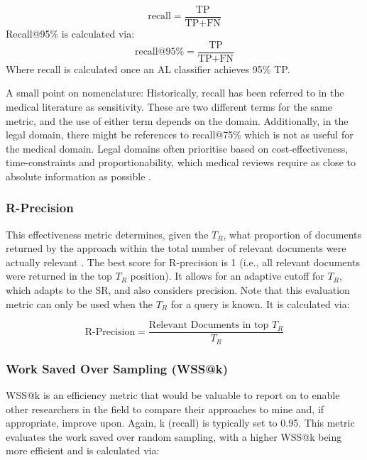 \documentclass[../main.tex]{subfiles}
\begin{document}
\begin{equation}
\text{recall} = \frac{\text{TP}}{\text{TP} + \text{FN}}
\end{equation}
Recall@95\% is calculated via:
\begin{equation}
\text{recall@95\%} = \frac{\text{TP}}{\text{TP} + \text{FN}}
\end{equation}
Where recall is calculated once an AL classifier achieves 95\% TP.

A small point on nomenclature: Historically, recall has been referred to in the medical literature as sensitivity. These are two different terms for the same metric, and the use of either term depends on the domain. Additionally, in the legal domain, there might be references to recall@75\% which is not as useful for the medical domain. Legal domains often prioritise based on cost-effectiveness, time-constraints and proportionability, which medical reviews require as close to absolute information as possible \cite{tsafnat_systematic_2014}.

\subsubsection{R-Precision}
This effectiveness metric determines, given the \textbf{$T_R$}, what proportion of documents returned by the approach within the total number of relevant documents were actually relevant \cite{manning_introduction_2008}. The best score for R-precision is 1 (i.e., all relevant documents were returned in the top \textbf{$T_R$} position). It allows for an adaptive cutoff for \textbf{$T_R$}, which adapts to the SR, and also considers precision. Note that this evaluation metric can only be used when the \textbf{$T_R$} for a query is known. It is calculated via:

\begin{equation}
\text{R-Precision} = \frac{\text{Relevant Documents in top } T_R}{T_R}
\end{equation}
\subsubsection{Work Saved Over Sampling (WSS@k)}

WSS@k is an efficiency metric that would be valuable to report on to enable other researchers in the field to compare their approaches to mine and, if appropriate, improve upon. Again, k (recall) is typically set to 0.95. This metric evaluates the work saved over random sampling, with a higher WSS@k being more efficient and is calculated via:
\end{document}
